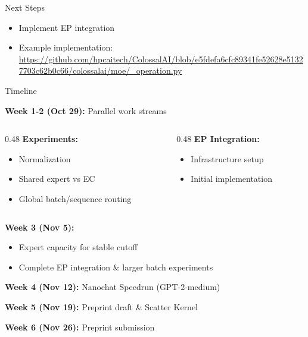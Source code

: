 \documentclass{beamer}
\begin{document}
\begin{frame}{Next Steps}

    \begin{itemize}
        \item Implement EP integration
        \item Example implementation: \url{https://github.com/hpcaitech/ColossalAI/blob/e5fdefa6cfc89341fe52628e51327703c62b0c66/colossalai/moe/_operation.py}
    \end{itemize}
\end{frame}


\begin{frame}{Timeline}

\textbf{Week 1-2 (Oct 29):} Parallel work streams
\begin{columns}[t]
\begin{column}{0.48\textwidth}
\textbf{Experiments:}
\begin{itemize}
    \item Normalization 
    \item Shared expert vs EC
    \item Global batch/sequence routing 
\end{itemize}
\end{column}

\begin{column}{0.48\textwidth}
\textbf{EP Integration:}
\begin{itemize}
    \item Infrastructure setup
    \item Initial implementation
\end{itemize}
\end{column}
\end{columns}

\vspace{0.3cm}

\textbf{Week 3 (Nov 5):}
\begin{itemize}
    \item Expert capacity for stable cutoff
    \item Complete EP integration \& larger batch experiments
\end{itemize}

\textbf{Week 4 (Nov 12):} Nanochat Speedrun (GPT-2-medium)

\textbf{Week 5 (Nov 19):} Preprint draft \& Scatter Kernel

\textbf{Week 6 (Nov 26):} Preprint submission

\end{frame}
\end{document}
